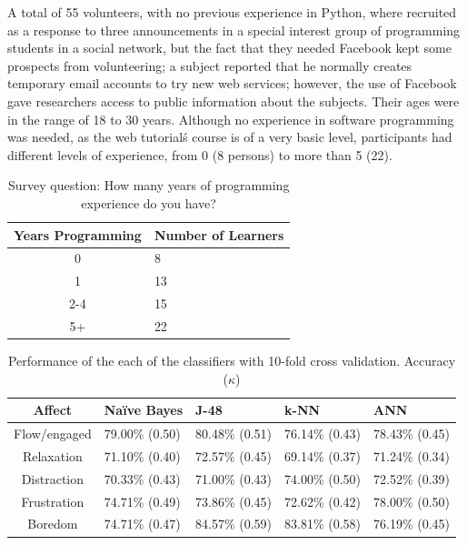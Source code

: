 \documentclass[a4paper,twoside]{article}
\begin{document}
A total of 55 volunteers, with no previous experience in Python, where recruited
as a response to three announcements in a special interest group of programming
students in a social network, but the fact that they needed Facebook kept some prospects from
volunteering; a subject reported that he normally creates temporary email
accounts to try new web services; however, the use of Facebook gave researchers access to public
information about the subjects. Their ages were in the range of 18 to
30 years. Although no experience in software programming was needed, as the
web tutorial\'s course is of a very basic level, participants had
different levels of experience, from 0 (8 persons) to more than 5 (22).

\begin{table}[!t]
\centering
\caption{ Survey question: How many years of programming experience do you have? }
\label{tab_results}
    \begin{tabular}{ | c | l | }
    \hline
    Years Programming          & Number of Learners \\
    \hline
   		0   &  8 \\
    \hline
    	1   &  13\\
    \hline
    	2-4  & 15\\
    \hline
    	5+   & 22\\
    \hline
    \end{tabular}

\end{table}


\begin{table}[!t]
\centering
\caption{Performance of the each of the classifiers with 10-fold cross validation. Accuracy ($\kappa$) }
\label{tab_performance}
    \begin{tabular}{ | c | l | l | l | l | }
    \hline
    Affect          & Na\"ive Bayes           & J-48                & k-NN              & ANN \\
    \hline
    Flow/engaged    & 79.00\% (0.50) & 80.48\% (0.51) & 76.14\% (0.43) & 78.43\% (0.45) \\
    \hline
    Relaxation      & 71.10\% (0.40) & 72.57\% (0.45) & 69.14\% (0.37) & 71.24\% (0.34)\\
    \hline
    Distraction     & 70.33\% (0.43) & 71.00\% (0.43) & 74.00\% (0.50) & 72.52\% (0.39)\\
    \hline
    Frustration     & 74.71\% (0.49) & 73.86\% (0.45) & 72.62\% (0.42) & 78.00\% (0.50)\\
    \hline
    Boredom         & 74.71\% (0.47) & 84.57\% (0.59) & 83.81\% (0.58) & 76.19\% (0.45)\\
    \hline
    \end{tabular}
\end{table}
\end{document}
